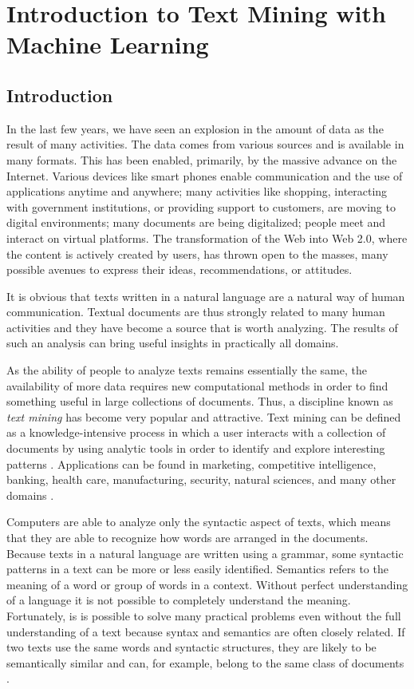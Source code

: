 \chapter{Introduction to Text Mining with Machine Learning}
\section{Introduction}

In the last few years, we have seen an explosion in the amount of data as the result of many activities.
The data comes from various sources and is available in many formats.
This has been enabled, primarily, by the massive advance on the Internet.
Various devices like smart phones enable communication and the use of applications anytime and anywhere;
many activities like shopping, interacting with government institutions, or providing support to customers, are moving to digital environments;
many documents are being digitalized; people meet and interact on virtual platforms.
The transformation of the Web into Web 2.0\cite{ref26}, where the content is actively created by users, has thrown open to the masses, many possible avenues to express their ideas, recommendations, or attitudes.

It is obvious that texts written in a natural language are a natural way of human communication.
Textual documents are thus strongly related to many human activities and they have become a source that is worth analyzing.
The results of such an analysis can bring useful insights in practically all domains.

As the ability of people to analyze texts remains essentially the same, the availability of more data requires new computational methods in order to find something useful in large collections of documents.
Thus, a discipline known as \textit{text mining} has become very popular and attractive.
Text mining can be defined as a knowledge-intensive process in which a user interacts with a collection of documents by using analytic tools in order to identify and explore interesting
patterns \cite{ref87}. Applications can be found in marketing, competitive intelligence,
banking, health care, manufacturing, security, natural sciences, and many other
domains \cite{ref254,ref192}.

Computers are able to analyze only the syntactic aspect of texts, which means
that they are able to recognize how words are arranged in the documents. Because
texts in a natural language are written using a grammar, some syntactic patterns
in a text can be more or less easily identified. Semantics refers to the meaning
of a word or group of words in a context. Without perfect understanding of a
language it is not possible to completely understand the meaning. Fortunately, is
is possible to solve many practical problems even without the full understanding
of a text because syntax and semantics are often closely related. If two texts use
the same words and syntactic structures, they are likely to be semantically similar
and can, for example, belong to the same class of documents \cite{ref196}.

